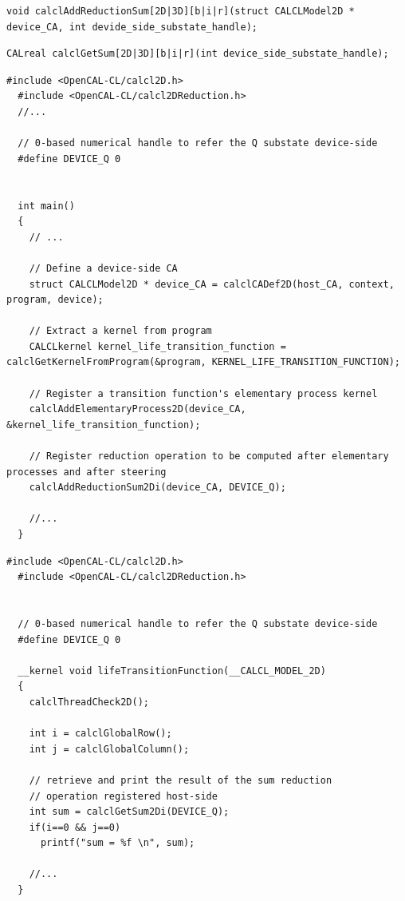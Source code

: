 \begin{lstlisting}[float,floatplacement=H, label=lst:calclAddReductionSum2Dr, caption=The calclAddReductionSum2Dr() host-side reduction registration function., numbers=none]
  void calclAddReductionSum[2D|3D][b|i|r](struct CALCLModel2D * device_CA, int devide_side_substate_handle);
\end{lstlisting}

\begin{lstlisting}[float,floatplacement=H, label=lst:calclGetSum2Dr, caption=The calclGetSum2Dr() device-side reduction retrieving function., numbers=none]
  CALreal calclGetSum[2D|3D][b|i|r](int device_side_substate_handle);
\end{lstlisting}



\begin{lstlisting}[float, label=lst:calcl_reduction_example_host, caption=An example of global reduction operation in a host-side OpenCAL-CL application.]
  #include <OpenCAL-CL/calcl2D.h>
  #include <OpenCAL-CL/calcl2DReduction.h>
  //...

  // 0-based numerical handle to refer the Q substate device-side
  #define DEVICE_Q 0

  
  int main()
  {
    // ...
    
    // Define a device-side CA
    struct CALCLModel2D * device_CA = calclCADef2D(host_CA, context, program, device);

    // Extract a kernel from program
    CALCLkernel kernel_life_transition_function = calclGetKernelFromProgram(&program, KERNEL_LIFE_TRANSITION_FUNCTION);

    // Register a transition function's elementary process kernel
    calclAddElementaryProcess2D(device_CA, &kernel_life_transition_function);

    // Register reduction operation to be computed after elementary processes and after steering
    calclAddReductionSum2Di(device_CA, DEVICE_Q);

    //...
  }
\end{lstlisting}


\begin{lstlisting}[float, label=lst:calcl_reduction_example_device, caption=An example of global reduction operation in a device-side OpenCAL-CL application.]
  #include <OpenCAL-CL/calcl2D.h>
  #include <OpenCAL-CL/calcl2DReduction.h>
  

  // 0-based numerical handle to refer the Q substate device-side
  #define DEVICE_Q 0

  __kernel void lifeTransitionFunction(__CALCL_MODEL_2D)
  {
    calclThreadCheck2D();
    
    int i = calclGlobalRow();
    int j = calclGlobalColumn();

    // retrieve and print the result of the sum reduction
    // operation registered host-side
    int sum = calclGetSum2Di(DEVICE_Q);
    if(i==0 && j==0) 	
      printf("sum = %f \n", sum);

    //...
  } 
\end{lstlisting}
